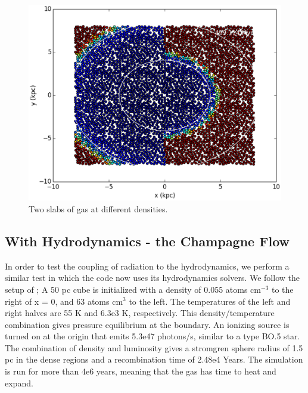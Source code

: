 \begin{figure}
\includegraphics[width=\textwidth]{graphics/gasWall01000HIslice.eps}
\caption[Two slabs of gas at different densities.]{Two slabs of gas at different densities.}
\label{fig:gaswall}
\end{figure}


\subsection{With Hydrodynamics - the Champagne Flow}
\label{sec:champagne}

In order to test the coupling of radiation to the hydrodynamics, we perform a similar test in which the code now uses its hydrodynamics solvers. We follow the setup of \citet{gendelevKrumholz12}; A 50 pc cube is initialized with a density of 0.055 atoms cm$^{-3}$ to the right of x = 0, and 63 atoms cm$^{3}$ to the left. The temperatures of the left and right halves are 55 K and 6.3e3 K, respectively. This density/temperature combination gives pressure equilibrium at the boundary. An ionizing source is turned on at the origin that emits 5.3e47 photons/s, similar to a type BO.5 star. The combination of density and luminosity gives a stromgren sphere radius of 1.5 pc in the dense regions and a recombination time of 2.48e4 Years. The simulation is run for more than 4e6 years, meaning that the gas has time to heat and expand.

